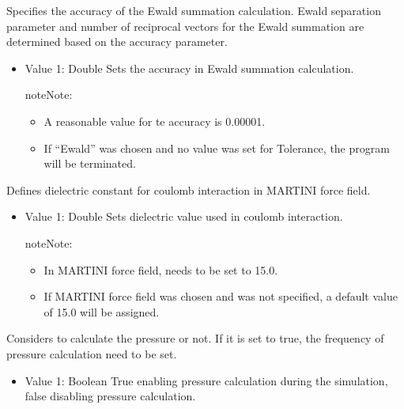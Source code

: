 \documentclass[letterpaper,10pt,english]{sphinxmanual}
\begin{document}
\begin{description}
\begin{itemize}
\end{itemize}

\item[{\sphinxcode{\sphinxupquote{Tolerance}}}] \leavevmode
Specifies the accuracy of the Ewald summation calculation. Ewald separation parameter and number of reciprocal vectors for the Ewald summation are determined based on the accuracy parameter.
\begin{itemize}
\item {} 
Value 1: Double \sphinxhyphen{} Sets the accuracy in Ewald summation calculation.

\begin{sphinxadmonition}{note}{Note:}\begin{itemize}
\item {} 
A reasonable value for te accuracy is 0.00001.

\item {} 
If “Ewald” was chosen and no value was set for Tolerance, the program will be terminated.

\end{itemize}
\end{sphinxadmonition}

\end{itemize}

\item[{\sphinxcode{\sphinxupquote{Dielectric}}}] \leavevmode
Defines dielectric constant for coulomb interaction in MARTINI force field.
\begin{itemize}
\item {} 
Value 1: Double \sphinxhyphen{} Sets dielectric value used in coulomb interaction.

\begin{sphinxadmonition}{note}{Note:}\begin{itemize}
\item {} 
In MARTINI force field,  needs to be set to 15.0.

\item {} 
If MARTINI force field was chosen and  was not specified, a default value of 15.0 will be assigned.

\end{itemize}
\end{sphinxadmonition}

\end{itemize}

\item[{\sphinxcode{\sphinxupquote{PressureCalc}}}] \leavevmode
Considers to calculate the pressure or not. If it is set to true, the frequency of pressure calculation need to be set.
\begin{itemize}
\item {} 
Value 1: Boolean \sphinxhyphen{} True enabling pressure calculation during the simulation, false disabling pressure calculation.


\end{itemize}
\end{description}
\end{document}
